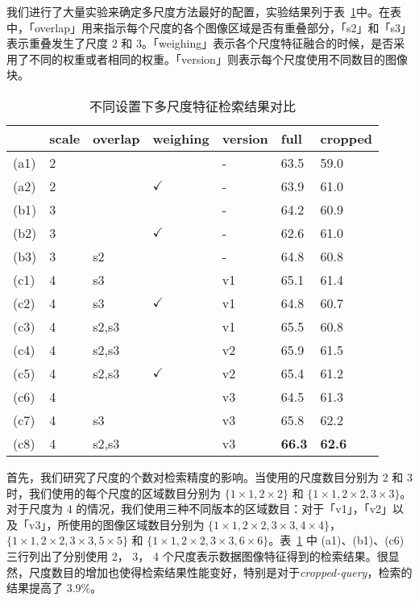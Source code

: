 我们进行了大量实验来确定多尺度方法最好的配置，实验结果列于表~\ref{table:multiscale_exp_result}中。在表中，「overlap」用来指示每个尺度的各个图像区域是否有重叠部分，「s2」和「s3」表示重叠发生了尺度 2 和 3。「weighing」表示各个尺度特征融合的时候，是否采用了不同的权重或者相同的权重。「version」则表示每个尺度使用不同数目的图像块。
\begin{table}[!t]
	\centering
	\caption{不同设置下多尺度特征检索结果对比}
	\label{table:multiscale_exp_result}
	\begin{tabular}{@{}lllllll@{}}
		\toprule
		&   scale &  overlap   &  weighing  & version &     full    &    cropped    \\
		\midrule
		(a1) &   2   & \texttimes & \texttimes &    -    &     63.5      &     59.0      \\
		(a2) &   2   & \texttimes & $\checkmark$ &    -    &     63.9      &     61.0      \\
		\midrule
		(b1) &   3   & \texttimes & \texttimes &    -    &     64.2      &     60.9      \\
		(b2) &   3   & \texttimes & $\checkmark$ &    -    &     62.6      &     61.0      \\
		(b3) &   3   &     s2     & \texttimes &    -    &     64.8      &     60.8      \\
		\midrule
		(c1) &   4   &     s3     & \texttimes &   v1    &     65.1      &     61.4      \\
		(c2) &   4   &     s3     & $\checkmark$ &   v1    &     64.8      &     60.7      \\
		(c3) &   4   &   s2,s3    & \texttimes &   v1    &     65.5      &     60.8      \\
		(c4) &   4   &   s2,s3    & \texttimes&   v2    &     65.9      &     61.5      \\
		(c5) &   4   &   s2,s3    & $\checkmark$ &   v2    &     65.4      &     61.2      \\
		(c6) &   4   & \texttimes & \texttimes &   v3    &     64.5      &     61.3      \\
		(c7) &   4   &     s3     & \texttimes&   v3    &     65.8      &     62.2      \\
		(c8) &   4   &   s2,s3    & \texttimes&   v3    & \textbf{66.3} & \textbf{62.6} \\
		\bottomrule
	\end{tabular}
\end{table}

首先，我们研究了尺度的个数对检索精度的影响。当使用的尺度数目分别为 2 和 3 时，我们使用的每个尺度的区域数目分别为 $\{1\times1, 2\times2\}$ 和
$\{1\times1, 2\times2, 3\times3\}$。对于尺度为 4 的情况，我们使用三种不同版本的区域数目：对于「v1」，「v2」以及「v3」，所使用的图像区域数目分别为 $\{1\times1, 2\times2, 3\times3, 4\times4\}$，$\{1\times1, 2\times2, 3\times3, 5\times5\}$ 和 $\{1\times1, 2\times2, 3\times3, 6\times6\}$。表~\ref{table:multiscale_exp_result} 中 (a1)、(b1)、(c6) 三行列出了分别使用 2， 3， 4 个尺度表示数据图像特征得到的检索结果。很显然，尺度数目的增加也使得检索结果性能变好，特别是对于\emph{cropped-query}，检索的结果提高了 3.9\%。

